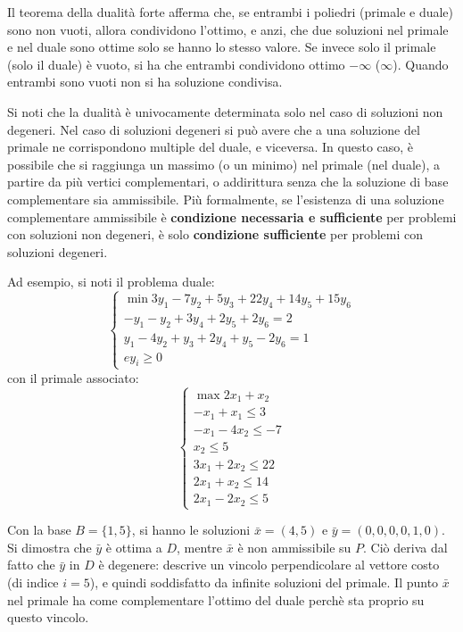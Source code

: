 \documentclass[a4paper,11pt]{article}
\begin{document}
Il teorema della dualità forte afferma che, se entrambi i poliedri (primale e duale) sono non vuoti, allora condividono l'ottimo, e anzi, che due soluzioni nel primale e nel duale sono ottime solo se hanno lo stesso valore.
Se invece solo il primale (solo il duale) è vuoto, si ha che entrambi condividono ottimo $-\infty$ ($\infty$).
Quando entrambi sono vuoti non si ha soluzione condivisa.

\par\medskip

Si noti che la dualità è univocamente determinata solo nel caso di soluzioni non degeneri.
Nel caso di soluzioni degeneri si può avere che a una soluzione del primale ne corrispondono multiple del duale, e viceversa.
In questo caso, è possibile che si raggiunga un massimo (o un minimo) nel primale (nel duale), a partire da più vertici complementari, o addirittura senza che la soluzione di base complementare sia ammissibile.
Più formalmente, se l'esistenza di una soluzione complementare ammissibile è \textbf{condizione necessaria e sufficiente} per problemi con soluzioni non degeneri, è solo \textbf{condizione sufficiente} per problemi con soluzioni degeneri.

Ad esempio, si noti il problema duale:
\[
	\begin{cases}
		\min 3y_1 - 7y_2 + 5y_3 + 22y_4 + 14y_5 + 15y_6 \\ 
-y_1 - y_2 +3 y_4 + 2y_5 + 2y_6 = 2 \\
y_1 - 4y_2 + y_3 + 2y_4 + y_5 - 2 y_6 = 1 \\e
y_i \geq 0	
	\end{cases}
\]
con il primale associato:
\[
	\begin{cases}
			
\max 2x_1 + x_2 \\ 
-x_1 + x_1 \leq 3 \\ 
-x_1 -4x_2 \leq -7 \\ 
x_2 \leq 5 \\ 
3 x_1 + 2 x_2 \leq 22 \\ 
2 x_1 + x_2 \leq 14 \\ 
2 x_1 - 2 x_2 \leq 5
	\end{cases}
\]

Con la base $B = \{ 1, 5 \}$, si hanno le soluzioni $\bar{x} = (4, 5)$ e $\bar{y} = (0, 0, 0,  0, 1, 0)$.
Si dimostra che $\bar{y}$ è ottima a $D$, mentre $\bar{x}$ è non ammissibile su $P$.
Ciò deriva dal fatto che $\bar{y}$ in $D$ è degenere: descrive un vincolo perpendicolare al vettore costo (di indice $i = 5$), e quindi soddisfatto da infinite soluzioni del primale.
Il punto $\bar{x}$ nel primale ha come complementare l'ottimo del duale perchè sta proprio su questo vincolo. 
\end{document}
